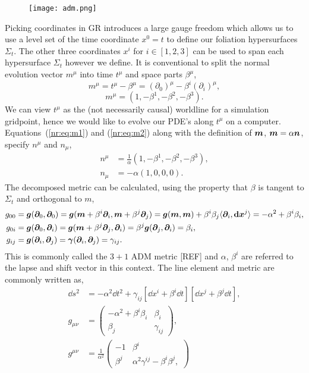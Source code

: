 \begin{figure}[h!]
    \texttt{[image: adm.png]}
\end{figure}
Picking coordinates in GR introduces a large gauge freedom which allows us to use a level set of the time coordinate $x^0=t$ to define our foliation hypersurfaces $\Sigma_t$. The other three coordinates $x^i$ for $i\in[1,2,3]$ can be used to span each hypersurface $\Sigma_t$ however we define. It is conventional to split the normal evolution vector $m^\mu$ into time $t^\mu$ and space parts $\beta^\mu$,
\begin{equation}\label{nr:eq:m1} m^\mu = t^\mu - \beta^\mu  = (\partial_0)^\mu - \beta^i (\partial_i)^\mu, \end{equation}
\begin{equation}\label{nr:eq:m2} m^\mu = \left( 1,-\beta^1,-\beta^2,-\beta^3\right). \end{equation}
We can view $t^\mu$ as the (not necessarily causal) worldline for a simulation gridpoint, hence we would like to evolve our PDE's along $t^\mu$ on a computer.  Equations~(\ref{nr:eq:m1}) and (\ref{nr:eq:m2}) along with the definition of $\boldsymbol{m}$, $\boldsymbol{m} = \alpha \boldsymbol{n}$,  specify $n^\mu$ and $n_\mu$,
\begin{align} 
n^\mu &=  \frac{1}{\alpha}\left( 1,-\beta^1,-\beta^2,-\beta^3\right),\\  
n_\mu &= -\alpha\left( 1,0,0,0\right).
\end{align}
The decomposed metric can be calculated, using the property that $\beta$ is tangent to $\Sigma_t$ and orthogonal to $m$,
\begin{align} 
g_{00} &= \boldsymbol{g}(\boldsymbol{\partial}_0,\boldsymbol{\partial}_0) = \boldsymbol{g}(\boldsymbol{m} + \beta^i \boldsymbol{\partial}_i,\boldsymbol{m} + \beta^j\boldsymbol{\partial}_j) = \boldsymbol{g}(\boldsymbol{m},\boldsymbol{m}) + \beta^i \beta_j \langle \boldsymbol{\partial}_i,{\boldsymbol{\mathrm{d}}} \boldsymbol{x}^j \rangle = -\alpha^2 + \beta^i \beta_i ,\\
 g_{0i} &= \boldsymbol{g} (\boldsymbol{\partial}_0,\boldsymbol{\partial}_i) =  \boldsymbol{g}(\boldsymbol{m} + \beta^j \boldsymbol{\partial}_j, \boldsymbol{\partial}_i) =   \beta^j\boldsymbol{g}( \boldsymbol{\partial}_j, \boldsymbol{\partial}_i) = \beta_i,\\
 g_{ij} &= \boldsymbol{g}(\boldsymbol{\partial}_i,\boldsymbol{\partial}_j) = \boldsymbol{\gamma}(\boldsymbol{\partial}_i,\boldsymbol{\partial}_j) = \gamma_{ij}.
 \end{align}
This is commonly called the $3+1$ ADM metric [REF] and $\alpha$, $\beta^i$ are referred to the lapse and shift vector in this context. The line element and metric are commonly written as,
\begin{align}
\dd s^2 &= -\alpha^2 \dd t^2 + \gamma_{ij}\left[\dd x^i + \beta^i \dd t\right]\left[\dd x^j + \beta^j \dd t\right],\\
 g_{\mu\nu} &= \begin{pmatrix} -\alpha^2 + \beta^i \beta_i & \beta_i \\ \beta_j & \gamma_{ij} \end{pmatrix},\label{nr:eq:admmetric}\\
  g^{\mu\nu} &= \frac{1}{\alpha^2}\begin{pmatrix} -1  & \beta^i \\ \beta^j & \alpha^2\gamma^{ij} - \beta^i \beta^j ,\end{pmatrix}
 \end{align}
